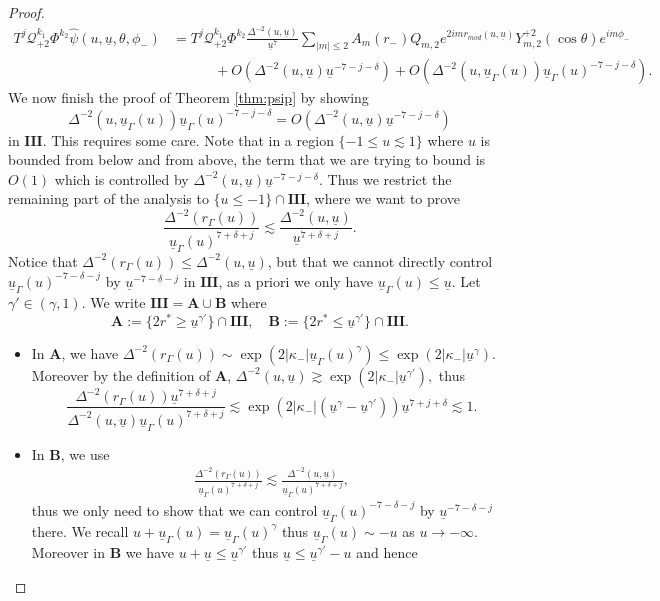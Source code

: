 \documentclass[10pt,a4paper]{amsart}
\newcommand{\carterp}{\mcq_{+2}}
\newcommand{\mcq}{\mathcal{Q}}
\newcommand{\psihat}{\widehat{\psi}}
\newcommand{\sfrak}{2}
\newcommand{\trois}{\mathbf{III}}
\newcommand{\ubar}{{\underline{u}}}
\begin{document}
\begin{proof}
\begin{align*}
    T^j\carterp^{k_1}\Phi^{k_2}\psihat(u,\ubar,\theta,\phi_{-})&=T^j\carterp^{k_1}\Phi^{k_2}\frac{\Delta^{-2}(u,\ubar)}{\ubar^7}\sum_{|m|\leq 2}A_m(r_-)Q_{m,2}e^{2imr_{mod}(u,\ubar)}Y_{m,\sfrak}^{+\sfrak}(\cos\theta)e^{im\phi_{-}}\\
    &\quad\quad\quad+O(\Delta^{-2}(u,\ubar)\ubar^{-7-j-\delta})+O(\Delta^{-2}(u,\ubar_\Gamma(u))\ubar_\Gamma(u)^{-7-j-\delta}).
\end{align*}
We now finish the proof of Theorem \ref{thm:psip} by showing 
$$\Delta^{-2}(u,\ubar_\Gamma(u))\ubar_\Gamma(u)^{-7-j-\delta}=O(\Delta^{-2}(u,\ubar)\ubar^{-7-j-\delta})$$
in $\trois$. This requires some care. Note that in a region $\{-1\leq u\lesssim 1\}$ where $u$ is bounded from below and from above, the term that we are trying to bound is $O(1)$ which is controlled by $\Delta^{-2}(u,\ubar)\ubar^{-7-j-\delta}$. Thus we restrict the remaining part of the analysis to $\{u\leq -1\}\cap\trois$, where we want to prove
$$\frac{\Delta^{-2}(r_\Gamma(u))}{\ubar_\Gamma(u)^{7+\delta+j}}\lesssim\frac{\Delta^{-2}(u,\ubar)}{\ubar^{7+\delta+j}}.$$
Notice that $\Delta^{-2}(r_\Gamma(u))\leq\Delta^{-2}(u,\ubar)$, but that we cannot directly control $\ubar_\Gamma(u)^{-7-\delta-j}$ by $\ubar^{-7-\delta-j}$ in $\trois$, as a priori we only have $\ubar_\Gamma(u)\leq\ubar$. Let $\gamma'\in(\gamma,1)$. We write $\trois=\mathbf{A}\cup\mathbf{B}$ where 
$$\mathbf{A}:=\{2r^*\geq\ubar^{\gamma'}\}\cap\trois,\quad\mathbf{B}:=\{2r^*\leq\ubar^{\gamma'}\}\cap\trois.$$ 
\begin{itemize}
    \item In $\mathbf{A}$, we have $\Delta^{-2}(r_\Gamma(u))\sim\exp(2|\kappa_-|\ubar_\Gamma(u)^\gamma)\leq \exp(2|\kappa_-|\ubar^\gamma)$. Moreover by the definition of $\mathbf{A}$, $\Delta^{-2}(u,\ubar)\gtrsim\exp(2|\kappa_-|\ubar^{\gamma'}),$
    thus 
    $$\frac{\Delta^{-2}(r_\Gamma(u))\ubar^{7+\delta+j}}{\Delta^{-2}(u,\ubar)\ubar_\Gamma(u)^{7+\delta+j}}\lesssim\exp(2|\kappa_-|(\ubar^\gamma-\ubar^{\gamma'}))\ubar^{7+j+\delta}\lesssim 1.$$
    \item In $\mathbf{B}$, we use
    \begin{align}\label{eqn:derrr}
        \frac{\Delta^{-2}(r_\Gamma(u))}{\ubar_\Gamma(u)^{7+\delta+j}}\lesssim\frac{\Delta^{-2}(u,\ubar)}{\ubar_\Gamma(u)^{7+\delta+j}},
    \end{align}
    thus we only need to show that we can control $\ubar_\Gamma(u)^{-7-\delta-j}$ by $\ubar^{-7-\delta-j}$ there. We recall $u+\ubar_\Gamma(u)=\ubar_\Gamma(u)^\gamma$ thus $\ubar_\Gamma(u)\sim -u$ as $u\to-\infty$. Moreover in $\mathbf{B}$ we have $u+\ubar\leq\ubar^{\gamma'}$ thus $\ubar\leq\ubar^{\gamma'}-u$ and hence 

\end{itemize}
\end{proof}
\end{document}
